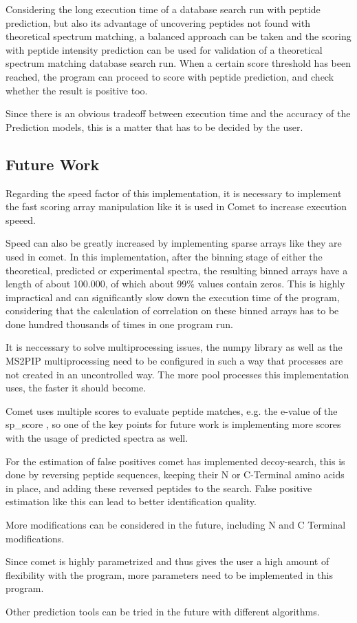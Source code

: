 \documentclass[11pt]{article}
\begin{document}
Considering the long execution time of a database search run with peptide prediction, but also its advantage of uncovering peptides not found with theoretical spectrum matching, a balanced approach can be taken and the scoring with peptide intensity prediction can be used for validation of a theoretical spectrum matching database search run. When a certain score threshold has been reached, the program can proceed to score with peptide prediction, and check whether the result is positive too.

Since there is an obvious tradeoff between execution time and the accuracy of the Prediction models, this is a matter that has to be decided by the user.

\subsection{Future Work}
Regarding the speed factor of this implementation, it is necessary to implement the fast scoring array manipulation like it is used in Comet to increase execution speeed. 

Speed can also be greatly increased by implementing sparse arrays like they are used in comet. In this implementation, after the binning stage of either the theoretical, predicted or experimental spectra, the resulting binned arrays have a length of about 100.000, of which about 99\% values contain zeros. This is highly impractical and can significantly slow down the execution time of the program, considering that the calculation of correlation on these binned arrays has to be done hundred thousands of times in one program run.

It is neccessary to solve multiprocessing issues, the numpy library as well as the MS2PIP multiprocessing need to be configured in such a way that processes are not created in an uncontrolled way. The more pool processes this implementation uses, the faster it should become.

Comet uses multiple scores to evaluate peptide matches, e.g. the e-value of the sp\_score , so one of the key points for future work is implementing more scores with the usage of predicted spectra as well.

For the estimation of false positives comet has implemented decoy-search, this is done by reversing peptide sequences, keeping their N or C-Terminal amino acids in place, and adding these reversed peptides to the search. False positive estimation like this can lead to better identification quality.

More modifications can be considered in the future, including N and C Terminal modifications.

Since comet is highly parametrized and thus gives the user a high amount of flexibility with the program, more parameters need to be implemented in this program.

Other prediction tools can be tried in the future with different algorithms.

\printbibliography
\end{document}

